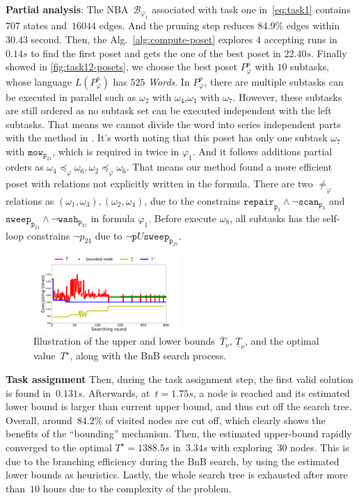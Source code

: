 \textbf{Partial analysis}:
The NBA~$\mathcal{B}_{\varphi_1}$ associated with task one in~\eqref{eq:task1}
contains~$707$ states and~$16044$ edges. And the pruning step reduces $84.9\%$ edges within 
$30.43$ second. Then, the Alg.~\ref{alg:compute-poset} explores 
 $4$ accepting runs in $0.14s$ to find the first poset and gets the one of the best poset in $22.40s$.
 Finally showed in \ref{fig:task12-posets}, we choose the best poset $P^{p}_{\varphi}$ with $10$ subtasks, whose language 
 $L(P^{p}_{\varphi})$ has $525$ \emph{Words}. In $P^{p}_{\varphi}$, there are 
 multiple subtasks can be executed in parallel such as $\omega_2 $ with $ \omega_4$,$\omega_1 $ with $ \omega_7$.
 However, these subtasks are still ordered as no subtask set can be executed independent with the left 
 subtasks. That means we cannot
 divide the word into series independent parts with the method in \cite{schillinger2018simultaneous}.
 It's worth noting that this poset has only one subtask $\omega_7$ with $\texttt{mow}_{\texttt{p}_{21}}$,
 which is required in twice in $\varphi_1$. And it follows additions partial orders as
 $\omega_4\preceq_\varphi \omega_6,\omega_2\preceq_\varphi \omega_6$. That means our method found 
 a more efficient poset with relations not explicitly written in the formula.
 There are two $\neq_\varphi$ relations as $(\omega_1,\omega_3),(\omega_2,\omega_4)$, due to the constrains 
 $\texttt{repair}_{\texttt{p}_3}\wedge\lnot\texttt{scan}_{\texttt{p}_3} $ and
  $\texttt{sweep}_{\texttt{p}_{21}} \wedge \lnot \texttt{wash}_{\texttt{p}_{21}}$ in formula $\varphi_1$.
  Before execute $\omega_8$, all subtasks has the self-loop constrains $\lnot p_{24}$ due to
   $\lnot \texttt{p} U \texttt{sweep}_{\texttt{p}_{27}}$.
   

\begin{figure}[t!]
\centering%
\includegraphics[width = 0.50\textwidth]{figures/simulation/taskfinal/bnb.pdf}
\caption{Illustration of the upper and lower
bounds~$\overline{T}_\nu,\,\underline{T}_\nu$, and the optimal value~$T^\star$,
along with the BnB search process.}
\label{fig:task2-bnb}
\end{figure}
\textbf{Task assignment}
Then, during the task assignment step,
the first valid solution is found in~$0.131s$.
Afterwards, at~$t=1.75s$, a node is reached and its estimated lower
bound is larger than current upper bound, and thus cut off the search tree.
Overall, around~$84.2\%$ of visited nodes are cut off,
which clearly shows the benefits of the ``bounding'' mechanism.
Then, the estimated upper-bound rapidly converged
to the optimal $T^\star=1388.5s$ in~$3.34s$ with exploring~$30$ nodes.
This is due to the branching efficiency during the BnB search,
by using the estimated lower bounds as heuristics.
Lastly, the whole search tree is exhausted after more than~$10$ hours
due to the complexity of the problem. 


